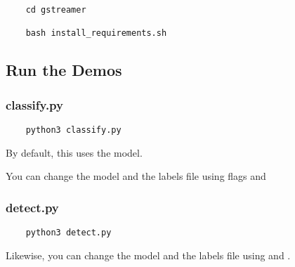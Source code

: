 \begin{verbatim}
	cd gstreamer
	
	bash install_requirements.sh
\end{verbatim}

\subsection{Run the Demos}

\subsubsection{classify.py}

\begin{verbatim}
	python3 classify.py
\end{verbatim}


By default, this uses the  model.

You can change the model and the labels file using flags  and 

\subsubsection{detect.py}

\begin{verbatim}
	python3 detect.py
\end{verbatim}

Likewise, you can change the model and the labels file using  and .

\clearpage